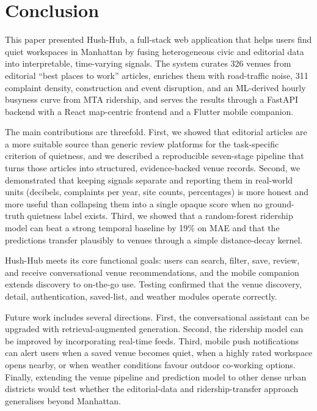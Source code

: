 \documentclass[conference]{IEEEtran}
\begin{document}
\section{Conclusion}
\label{sec:conclusion}

This paper presented Hush-Hub, a full-stack web application that helps users find quiet workspaces in Manhattan by fusing heterogeneous civic and editorial data into interpretable, time-varying signals. The system curates 326 venues from editorial ``best places to work'' articles, enriches them with road-traffic noise, 311 complaint density, construction and event disruption, and an ML-derived hourly busyness curve from MTA ridership, and serves the results through a FastAPI backend with a React map-centric frontend and a Flutter mobile companion.

The main contributions are threefold. First, we showed that editorial articles are a more suitable source than generic review platforms for the task-specific criterion of quietness, and we described a reproducible seven-stage pipeline that turns those articles into structured, evidence-backed venue records. Second, we demonstrated that keeping signals separate and reporting them in real-world units (decibels, complaints per year, site counts, percentages) is more honest and more useful than collapsing them into a single opaque score when no ground-truth quietness label exists. Third, we showed that a random-forest ridership model can beat a strong temporal baseline by 19\% on MAE and that the predictions transfer plausibly to venues through a simple distance-decay kernel.

Hush-Hub meets its core functional goals: users can search, filter, save, review, and receive conversational venue recommendations, and the mobile companion extends discovery to on-the-go use. Testing confirmed that the venue discovery, detail, authentication, saved-list, and weather modules operate correctly.

Future work includes several directions. First, the conversational assistant can be upgraded with retrieval-augmented generation. Second, the ridership model can be improved by incorporating real-time feeds. Third, mobile push notifications can alert users when a saved venue becomes quiet, when a highly rated workspace opens nearby, or when weather conditions favour outdoor co-working options. Finally, extending the venue pipeline and prediction model to other dense urban districts would test whether the editorial-data and ridership-transfer approach generalises beyond Manhattan.



\end{document}
